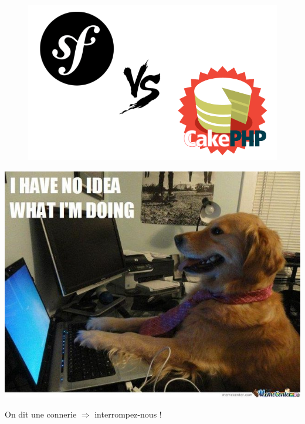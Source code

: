 \begin{frame}
  \begin{figure}
    \includegraphics[scale=0.40]{img/intro.png}
  \end{figure}
\end{frame}

\begin{frame}
  \begin{center}
    \includegraphics[scale=0.40]{img/noidea.jpg}

    On dit une connerie $\Rightarrow$ interrompez-nous !
  \end{center}
\end{frame}
